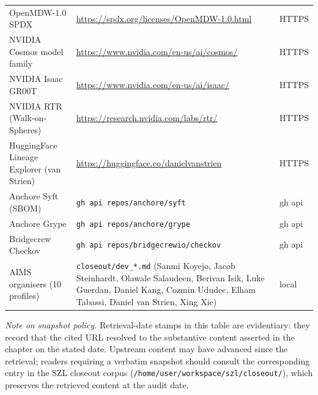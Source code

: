 \begin{center}
\begin{tabular}{p{4.0cm}p{8.5cm}p{2.0cm}}
OpenMDW-1.0 SPDX & \url{https://spdx.org/licenses/OpenMDW-1.0.html} & HTTPS \\
NVIDIA Cosmos model family & \url{https://www.nvidia.com/en-us/ai/cosmos/} & HTTPS \\
NVIDIA Isaac GR00T & \url{https://www.nvidia.com/en-us/ai/isaac/} & HTTPS \\
NVIDIA RTR (Walk-on-Spheres) & \url{https://research.nvidia.com/labs/rtr/} & HTTPS \\
HuggingFace Lineage Explorer (van Strien) & \url{https://huggingface.co/danielvanstrien} & HTTPS \\
Anchore Syft (SBOM) & \texttt{gh api repos/anchore/syft} & gh api \\
Anchore Grype & \texttt{gh api repos/anchore/grype} & gh api \\
Bridgecrew Checkov & \texttt{gh api repos/bridgecrewio/checkov} & gh api \\
AIMS organisers (10 profiles) & \texttt{closeout/dev\_*.md} (Sanmi Koyejo, Jacob Steinhardt, Olawale Salaudeen, Berivan Isik, Luke Guerdan, Daniel Kang, Cozmin Ududec, Elham Tabassi, Daniel van Strien, Xing Xie) & local \\
\end{tabular}
\end{center}

\noindent\emph{Note on snapshot policy.}  Retrieval-date stamps in this
table are evidentiary: they record that the cited URL resolved to the
substantive content asserted in the chapter on the stated date.  Upstream
content may have advanced since the retrieval; readers requiring a
verbatim snapshot should consult the corresponding entry in the SZL
closeout corpus (\texttt{/home/user/workspace/szl/closeout/}), which
preserves the retrieved content at the audit date.
